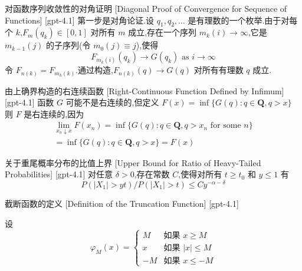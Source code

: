 \documentclass[UTF8]{ctexart}
\begin{document}
    
    
    \begin{prf}
        {对函数序列收敛性的对角证明}
        [Diagonal Proof of Convergence for Sequence of Functions]
        [gpt-4.1]
        第一步是对角论证.设 $q_{1}, q_{2}, \dots$ 是有理数的一个枚举.由于对每个 $k$,$F_{m} ( q_{k} ) \in [0, 1]$ 对所有 $m$ 成立,存在一个序列 $m_{k}(i) \to \infty$,它是 $m_{k-1}(j)$ 的子序列(令 $m_{0}(j) \equiv j$),使得
\[
F_{m_{k}(i)} ( q_{k} ) \to G ( q_{k} ) \text{ as } i \to \infty
\]
令 $F_{n(k)} = F_{m_{k}(k)}$.通过构造,$F_{n(k)} ( q ) \to G ( q )$ 对所有有理数 $q$ 成立.

    \end{prf}
    
    
    
    \begin{dfn}
        {由上确界构造的右连续函数}
        [Right-Continuous Function Defined by Infimum]
        [gpt-4.1]
        函数 $G$ 可能不是右连续的,但定义 $F ( x ) = \inf \{ G ( q ) : q \in \mathbf{Q}, q > x \}$ 则 $F$ 是右连续的,因为
\[
\begin{array}{l}
\lim_{x_{n} \downarrow x} F ( x_{n} ) = \inf \{ G ( q ) : q \in \mathbf{Q}, q > x_{n} \text{ for some } n \} \\
= \inf \{ G ( q ) : q \in \mathbf{Q}, q > x \} = F ( x )
\end{array}
\]

    \end{dfn}
    
    
    
    \begin{thm}
        {关于重尾概率分布的比值上界}
        [Upper Bound for Ratio of Heavy-Tailed Probabilities]
        [gpt-4.1]
        对任意 $\delta > 0$,存在常数 $C$,使得对所有 $t \geq t_{0}$ 和 $y \leq 1$ 有
\[
P ( | X_{1} | > y t ) / P ( | X_{1} | > t ) \leq C y^{ - \alpha - \delta }
\]

    \end{thm}
    
    
    
    \begin{dfn}
        {截断函数的定义}
        [Definition of the Truncation Function]
        [gpt-4.1]
        
设
\[
\varphi_{M}(x) = \left\{
  \begin{array}{ll}
    M & \text{如果 } x \geq M \\
    x & \text{如果 } |x| \leq M \\
    -M & \text{如果 } x \leq -M
  \end{array}
\right.
\]

    \end{dfn}
    
\end{document}
